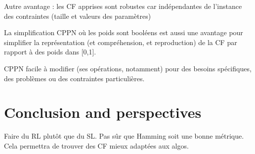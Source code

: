 \documentclass{article}
\begin{document}
Autre avantage  : les CF  apprises sont robustes car  indépendantes de
l'instance des contraintes (taille et valeurs des paramètres)

La  simplification CPPN  où  les  poids sont  booléens  est aussi  une
avantage  pour  simplifier  la représentation  (et  compréhension,  et
reproduction) de la CF par rapport à des poids dans [0,1].

CPPN facile  à modifier (ses  opérations, notamment) pour  des besoins
spécifiques, des problèmes ou des contraintes particulières.


\section{Conclusion and perspectives}\label{sec:conclusion}

Faire du  RL plutôt  que du  SL. Pas  sûr que  Hamming soit  une bonne
métrique. Cela permettra de trouver des CF mieux adaptées aux algos.




\end{document}
